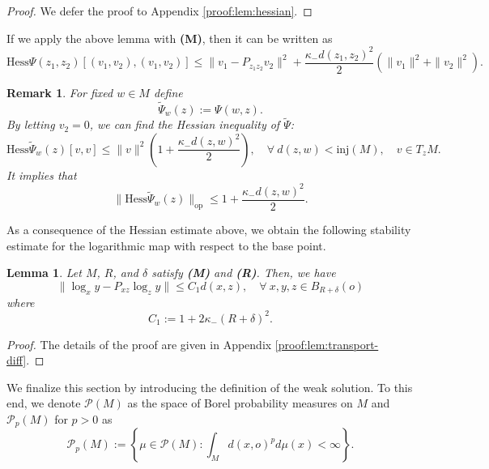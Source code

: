 \documentclass[11pt]{amsart}
\newtheorem{lemma}{Lemma}[section]
\newtheorem{remark}{Remark}[section]
\newcommand{\p}{o}%
\newcommand{\dist}{d}%
\newcommand{\inj}{\mathrm{inj}}%
\begin{document}
\begin{proof}
We defer the proof to Appendix \ref{proof:lem:hessian}.
\end{proof}

If we apply the above lemma with \textbf{(M)}, then it can be written as
\begin{equation}\label{es: Hess}
    \mathrm{Hess}\Psi(z_1, z_2)[(v_1, v_2), (v_1, v_2)]\leq\|v_1-P_{z_1z_2}v_2\|^2+
\frac{\kappa_-\dist(z_1, z_2)^2}{2}\left(\|v_1\|^2+\|v_2\|^2\right).
\end{equation}


\begin{remark} \label{R2.1}
For fixed $w\in M$ define
\[
\tilde{\Psi}_w(z):=\Psi(w, z).
\]
By letting $v_2=0$, we can find the Hessian inequality of $\tilde{\Psi}$:
\[
\mathrm{Hess}\tilde{\Psi}_w(z)[v, v]\leq \|v\|^2\left(1+\frac{\kappa_-\dist(z, w)^2}{2}\right),\quad\forall~\dist(z, w)<\inj(M),\quad v\in T_zM.
\]
It implies that
\[
\|\mathrm{Hess}\tilde{\Psi}_w(z)\|_{\mathrm{op}}\leq1+\frac{\kappa_-\dist(z, w)^2}{2}.
\]
\end{remark}

As a consequence of the Hessian estimate above, we obtain the following stability estimate for the logarithmic map with respect to the base point.

\begin{lemma}\label{lem:transport-diff}
Let $M$, $R$, and $\delta$ satisfy \textbf{(M)} and \textbf{(R)}. Then, we have
\[
\|\log_{x}y-P_{xz}\log_{z}
y\|\leq C_1\dist(x, z),\quad\forall~x, y, z\in B_{R+\delta}(\p)
\]
where
\[
C_1:=1+2\kappa_-(R+\delta)^2.
\]
\end{lemma}

\begin{proof}

The details of the proof are given in Appendix \ref{proof:lem:transport-diff}.



\end{proof}

We finalize this section by introducing the definition of the weak solution. To this end, we denote $\mathcal P(M)$ as the space of Borel probability measures on $M$ and $\mathcal P_p(M)$ for $p>0$ as 
\[
\mathcal P_p(M):= \left \{ \mu \in \mathcal P(M): \int_M d(x,o)^p d\mu(x) <\infty       \right\}.
\]

 
\end{document}
